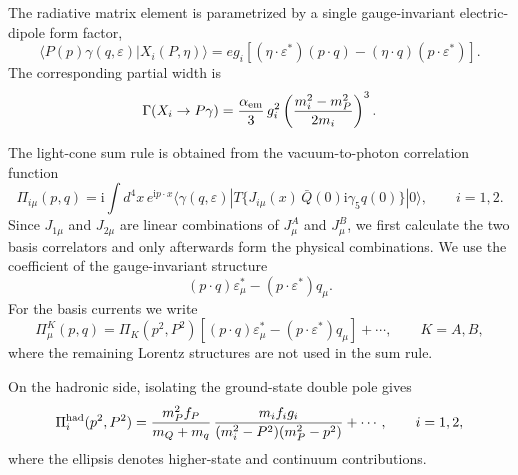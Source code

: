 \documentclass[aps,prd,preprint,nofootinbib,superscriptaddress]{revtex4-2}
\newcommand{\ii}{\mathrm{i}}
\begin{document}
The radiative matrix element is parametrized by a single gauge-invariant
electric-dipole form factor,
\begin{equation}
  \langle P(p)\gamma(q,\varepsilon)|X_i(P,\eta)\rangle
  =
  e g_i
  \left[
  (\eta\cdot\varepsilon^*)(p\cdot q)
  -(\eta\cdot q)(p\cdot\varepsilon^*)
  \right].
  \label{eq:e1}
\end{equation}
The corresponding partial width is
\begin{equation}
  \Gamma(X_i\to P\gamma)
  =
  \frac{\alpha_{\rm em}}{3}\,g_i^2
  \left(
  \frac{m_i^2-m_P^2}{2m_i}
  \right)^3 .
  \label{eq:width}
\end{equation}

The light-cone sum rule is obtained from the vacuum-to-photon correlation
function
\begin{equation}
  \Pi_{i\mu}(p,q)=\ii\int d^4x\,e^{\ii p\cdot x}
  \langle\gamma(q,\varepsilon)|
  T\{J_{i\mu}(x)\,\bar Q(0)\ii\gamma_5 q(0)\}
  |0\rangle ,
  \qquad i=1,2 .
  \label{eq:corr-physical}
\end{equation}
Since \(J_{1\mu}\) and \(J_{2\mu}\) are linear combinations of \(J^A_\mu\) and
\(J^B_\mu\), we first calculate the two basis correlators and only afterwards
form the physical combinations.  We use the coefficient of the gauge-invariant
structure
\begin{equation}
  (p\cdot q)\varepsilon_\mu^*
  -(p\cdot\varepsilon^*)q_\mu .
  \label{eq:projector}
\end{equation}
For the basis currents we write
\begin{equation}
  \Pi^K_\mu(p,q)=
  \Pi_K(p^2,P^2)
  \left[
  (p\cdot q)\varepsilon_\mu^*
  -(p\cdot\varepsilon^*)q_\mu
  \right]
  +\cdots ,
  \qquad K=A,B ,
  \label{eq:basis-decomp}
\end{equation}
where the remaining Lorentz structures are not used in the sum rule.

On the hadronic side, isolating the ground-state double pole gives
\begin{equation}
  \Pi^{\rm had}_{i}(p^2,P^2)
  =
  \frac{m_P^2 f_P}{m_Q+m_q}\,
  \frac{m_i f_i g_i}
  {(m_i^2-P^2)(m_P^2-p^2)}
  +\cdots ,
  \qquad i=1,2 ,
  \label{eq:hadronic-invariant}
\end{equation}
where the ellipsis denotes higher-state and continuum contributions.
\end{document}
